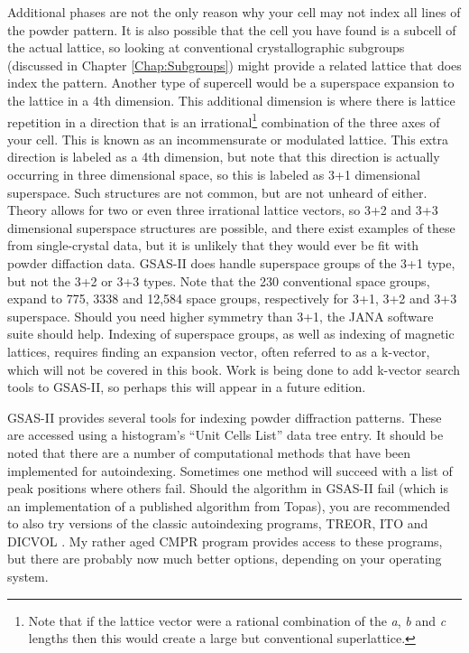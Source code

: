 Additional phases are not the only reason why your cell may not index all lines of the powder pattern. It is also possible that the cell you have found is a subcell of the actual lattice, so looking at conventional crystallographic subgroups (discussed in Chapter \ref{Chap:Subgroups}) might provide a related lattice that does index the pattern. Another type of supercell would be a superspace expansion to the lattice in a 4th dimension. This additional dimension is where there is lattice repetition in a direction that is an irrational\footnote{Note that if the lattice vector were a rational combination of the \textit{a}, \textit{b} and \textit{c} lengths then this would create a large but conventional superlattice.} combination of the three axes of your cell.  This is known as an incommensurate or modulated lattice. This extra direction is labeled as a 4th dimension, but note that this direction is actually occurring in three dimensional space, so this is labeled as 3+1 dimensional superspace. Such structures are not common, but are not unheard of either. Theory allows for two or even three irrational lattice vectors, so 3+2 and 3+3 dimensional superspace structures are possible, and there exist examples of these from single-crystal data, but it is unlikely that they would ever be fit with powder diffaction data.  GSAS-II does handle superspace groups of the 3+1 type, but not the 3+2 or 3+3 types. Note that the 230 conventional space groups, expand to 775, 3338 and 12,584 space groups, respectively for 3+1, 3+2 and 3+3 superspace. Should you need higher symmetry than 3+1, the JANA software suite should help. Indexing of superspace groups, as well as indexing of magnetic lattices, requires finding an expansion vector, often referred to as a k-vector, which will not be covered in this book. Work is being done to add k-vector search tools to GSAS-II, so perhaps this will appear in a future edition. 

GSAS-II provides several tools for indexing powder diffraction patterns. These are accessed using a histogram's ``Unit Cells List'' data tree entry.  It should be noted that there are a number of computational methods that have been implemented for autoindexing. Sometimes one method will succeed with a list of peak positions where others fail. Should the algorithm in GSAS-II fail (which is an implementation of a published algorithm from Topas), you are recommended to also try versions of the classic autoindexing programs, TREOR, ITO and DICVOL . My rather aged CMPR program provides access to these programs, but there are probably now much better options, depending on your operating system. 

